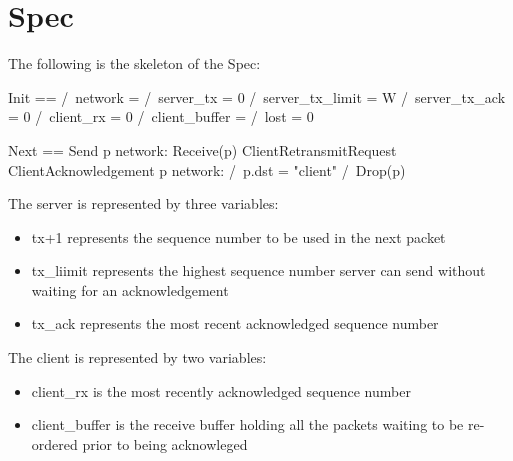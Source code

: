 \section{Spec}

The following is the skeleton of the Spec: 
\newline

\begin{tla}
Init ==
    /\ network = {}
    /\ server_tx = 0
    /\ server_tx_limit = W
    /\ server_tx_ack = 0
    /\ client_rx = 0
    /\ client_buffer = {} 
    /\ lost = 0

Next == 
    \/ Send 
    \/ \E p \in network: 
        Receive(p)
    \/ ClientRetransmitRequest
    \/ ClientAcknowledgement
    \/ \E p \in network: 
        /\ p.dst = "client" 
        /\ Drop(p)
\end{tla}
\begin{tlatex}
%
%
%
%
%
%
%
%
\@pvspace{8.0pt}%
%
%
%
%
%
%
%
%
%
\end{tlatex}
\newline

The server is represented by three variables: 
\begin{itemize}
    \item tx+1 represents the sequence number to be used in the next packet
    \item tx\_liimit represents the highest sequence number server can send
    without waiting for an acknowledgement
    \item tx\_ack represents the most recent acknowledged sequence number
\end{itemize}

The client is represented by two variables: 
\begin{itemize}
    \item client\_rx is the most recently acknowledged sequence number
    \item client\_buffer is the receive buffer holding all the packets waiting 
    to be re-ordered prior to being acknowleged 
\end{itemize}

